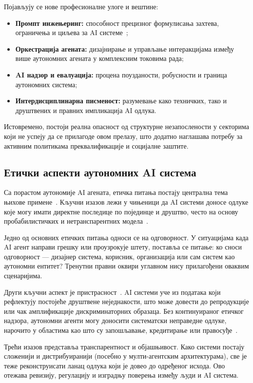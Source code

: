 Појављују се нове професионалне улоге и вештине:
\begin{itemize}
    \item \textbf{Промпт инжењеринг:} способност прецизног формулисања захтева, ограничења и циљева за AI системе~\cite{sahoo2024prompt};
    \item \textbf{Оркестрација агената:} дизајнирање и управљање интеракцијама између више аутономних агената у комплексним токовима рада;
    \item \textbf{AI надзор и евалуација:} процена поузданости, робусности и граница аутономних система;
    \item \textbf{Интердисциплинарна писменост:} разумевање како техничких, тако и друштвених и правних импликација AI одлука.
\end{itemize}

Истовремено, постоји реална опасност од структурне незапослености у секторима који не успеју да се прилагоде овом прелазу, што додатно наглашава потребу за активним политикама преквалификације и социјалне заштите.

\subsection{Етички аспекти аутономних AI система}

Са порастом аутономије AI агената, етичка питања постају централна тема њихове примене~\cite{hleg2019,bender2021}. Кључни изазов лежи у чињеници да AI системи доносе одлуке које могу имати директне последице по појединце и друштво, често на основу пробабилистичких и нетранспарентних модела~\cite{russell2020}.

Једно од основних етичких питања односи се на одговорност. У ситуацијама када AI агент направи грешку или проузрокује штету, поставља се питање: ко сноси одговорност — дизајнер система, корисник, организација или сам систем као аутономни ентитет? Тренутни правни оквири углавном нису прилагођени оваквим сценаријима.

Други кључни аспект је пристрасност~\cite{bender2021}. AI системи уче из података који рефлектују постојеће друштвене неједнакости, што може довести до репродукције или чак амплификације дискриминаторних образаца. Без континуираног етичког надзора, аутономни агенти могу доносити систематски неправедне одлуке, нарочито у областима као што су запошљавање, кредитирање или правосуђе~\cite{hleg2019}.

Трећи изазов представља транспарентност и објашњивост. Како системи постају сложенији и дистрибуиранији (посебно у мулти-агентским архитектурама), све је теже реконструисати ланац одлука који је довео до одређеног исхода. Ово отежава ревизију, регулацију и изградњу поверења између људи и AI система.

